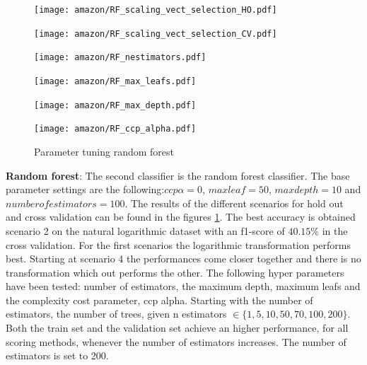 \documentclass[11pt]{article}
\begin{document}
%
\begin{figure}[t]
\begin{minipage}[t]{0.33\textwidth}
\texttt{[image: amazon/RF\_scaling\_vect\_selection\_HO.pdf]}
\end{minipage}
\begin{minipage}[t]{0.33\textwidth}
\texttt{[image: amazon/RF\_scaling\_vect\_selection\_CV.pdf]}
\end{minipage}
\begin{minipage}[t]{0.33\textwidth}
\texttt{[image: amazon/RF\_nestimators.pdf]}
\end{minipage}
\begin{minipage}[t]{0.33\textwidth}
\texttt{[image: amazon/RF\_max\_leafs.pdf]}
\end{minipage}
\begin{minipage}[t]{0.33\textwidth}
\texttt{[image: amazon/RF\_max\_depth.pdf]}
\end{minipage}
\begin{minipage}[t]{0.33\textwidth}
\texttt{[image: amazon/RF\_ccp\_alpha.pdf]}
\end{minipage}
\caption{Parameter tuning random forest}
\label{Fig::Random forest parameter tuning}
\end{figure}
%
\newline
\textbf{Random forest}: The second classifier is the random forest classifier. The base parameter settings are the following:$ccp \alpha = 0$, $max leaf = 50$, $max depth = 10$ and
$number of estimators = 100$. The results of the different scenarios for hold out and cross validation can be found in the figures \ref{Fig::Random forest parameter tuning}. The best accuracy is obtained scenario 2 on the natural logarithmic dataset with an f1-score of $40.15\%$ in the cross validation. For the first scenarios the logarithmic transformation performs best. Starting at scenario 4 the performances come closer together and there is no transformation which out performs the other. 
\newline
The following hyper parameters have been tested: number of estimators, the maximum depth, maximum leafs and the complexity cost parameter, ccp alpha. Starting with the number of estimators, the number of trees, given n estimators $\in \{1,5,10, 50, 70, 100, 200\}$. 
\newline
Both the train set and the validation set achieve an higher performance, for all scoring methods, whenever the number of estimators increases. The number of estimators is set to 200.
\newline
\end{document}

